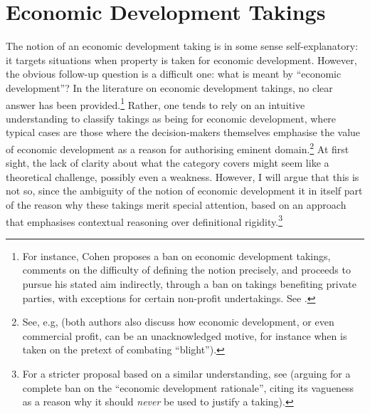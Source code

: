 \section{Economic Development Takings}\label{sec:edt}

The notion of an economic development taking is in some sense self-explanatory: it targets situations when property is taken for economic development. However, the obvious follow-up question is a difficult one: what is meant by ``economic development''? In the literature on economic development takings, no clear answer has been provided.\footnote{For instance, Cohen proposes a ban on economic development takings, comments on the difficulty of defining the notion precisely, and proceeds to pursue his stated aim indirectly, through a ban on takings benefiting private parties, with exceptions for certain non-profit undertakings. See \cite[558-567]{cohen06}.} Rather, one tends to rely on an intuitive understanding to classify takings as being for economic development, where typical cases are those where the decision-makers themselves emphasise the value of economic development as a reason for authorising  eminent domain.\footnote{See, e.g, \cite{soming07,ely09} (both authors also discuss how economic development, or even commercial profit, can be an unacknowledged motive, for instance when is taken on the pretext of combating ``blight'').} At first sight, the lack of clarity about what the category covers might seem like a theoretical challenge, possibly even a weakness. However, I will argue that this is not so, since the ambiguity of the notion of economic development it in itself part of the reason why these takings merit special attention, based on an approach that emphasises contextual reasoning over definitional rigidity.\footnote{For a stricter proposal based on a similar understanding, see \cite{somin07} (arguing for a complete ban on the ``economic development rationale'', citing its vagueness as a reason why it should {\it never} be used to justify a taking).}

